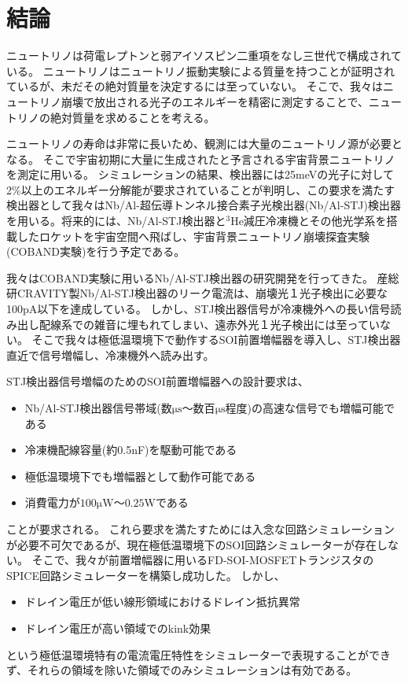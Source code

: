 \chapter{結論}
	ニュートリノは荷電レプトンと弱アイソスピン二重項をなし三世代で構成されている。
	ニュートリノはニュートリノ振動実験による質量を持つことが証明されているが、未だその絶対質量を決定するには至っていない。
	そこで、我々はニュートリノ崩壊で放出される光子のエネルギーを精密に測定することで、ニュートリノの絶対質量を求めることを考える。
	
	ニュートリノの寿命は非常に長いため、観測には大量のニュートリノ源が必要となる。
	そこで宇宙初期に大量に生成されたと予言される宇宙背景ニュートリノを測定に用いる。
	シミュレーションの結果、検出器には25meVの光子に対して2\%以上のエネルギー分解能が要求されていることが判明し、この要求を満たす検出器として我々はNb/Al-超伝導トンネル接合素子光検出器(Nb/Al-STJ)検出器を用いる。将来的には、Nb/Al-STJ検出器と$\mathrm{^{3}He}$減圧冷凍機とその他光学系を搭載したロケットを宇宙空間へ飛ばし、宇宙背景ニュートリノ崩壊探査実験(COBAND実験)を行う予定である。
	
	我々はCOBAND実験に用いるNb/Al-STJ検出器の研究開発を行ってきた。
	産総研CRAVITY製Nb/Al-STJ検出器のリーク電流は、崩壊光１光子検出に必要な100pA以下を達成している。
	しかし、STJ検出器信号が冷凍機外への長い信号読み出し配線系での雑音に埋もれてしまい、遠赤外光１光子検出には至っていない。
	そこで我々は極低温環境下で動作するSOI前置増幅器を導入し、STJ検出器直近で信号増幅し、冷凍機外へ読み出す。
	
	STJ検出器信号増幅のためのSOI前置増幅器への設計要求は、
	\begin{itemize}
		\item Nb/Al-STJ検出器信号帯域(数$\mathrm{\mu s}$〜数百$\mathrm{\mu s}$程度)の高速な信号でも増幅可能である
		\item 冷凍機配線容量(約0.5nF)を駆動可能である
		\item 極低温環境下でも増幅器として動作可能である
		\item 消費電力が$100\mathrm{\mu W}$〜$0.25\mathrm{W}$である
	\end{itemize}
	ことが要求される。
	これら要求を満たすためには入念な回路シミュレーションが必要不可欠であるが、現在極低温環境下のSOI回路シミュレーターが存在しない。
	そこで、我々が前置増幅器に用いるFD-SOI-MOSFETトランジスタのSPICE回路シミュレーターを構築し成功した。
	しかし、
	\begin{itemize}
		\item ドレイン電圧が低い線形領域におけるドレイン抵抗異常
		\item ドレイン電圧が高い領域でのkink効果
	\end{itemize}
	という極低温環境特有の電流電圧特性をシミュレーターで表現することができず、それらの領域を除いた領域でのみシミュレーションは有効である。

